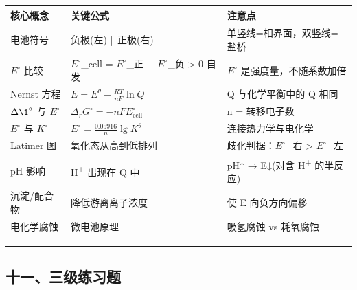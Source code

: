 {\def\LTcaptype{none} %
\begin{longtable}[]{@{}
  >{\raggedright\arraybackslash}p{}
  >{\raggedright\arraybackslash}p{}
  >{\raggedright\arraybackslash}p{}@{}}
\toprule\noalign{}
\begin{minipage}[b]{\linewidth}\raggedright
核心概念
\end{minipage} & \begin{minipage}[b]{\linewidth}\raggedright
关键公式
\end{minipage} & \begin{minipage}[b]{\linewidth}\raggedright
注意点
\end{minipage} \\
\midrule\noalign{}
\endhead
\bottomrule\noalign{}
\endlastfoot
电池符号 & 负极(左) ‖ 正极(右) & 单竖线=相界面，双竖线=盐桥 \\
\(E^{\circ}\) 比较 & \(E^{\circ}\)\_cell = \(E^{\circ}\)\_正 − \(E^{\circ}\)\_负 \textgreater{} 0 自发 & \(E^{\circ}\) 是强度量，不随系数加倍 \\
Nernst 方程 & \(E = E^\theta - \frac{RT}{nF}\ln Q\) & Q 与化学平衡中的 Q 相同 \\
\(\Delta \1^{\circ}\) 与 \(E^{\circ}\) & \(\Delta_rG^\circ = -nFE^\circ_{\text{cell}}\) & n = 转移电子数 \\
\(E^{\circ}\) 与 \(K^{\circ}\) & \(E^\circ = \frac{0.05916}{n}\lg K^\theta\) & 连接热力学与电化学 \\
Latimer 图 & 氧化态从高到低排列 & 歧化判据：\(E^{\circ}\)\_右 \textgreater{} \(E^{\circ}\)\_左 \\
pH 影响 & H\textsuperscript{+} 出现在 Q 中 & pH↑ → E↓(对含 H\textsuperscript{+} 的半反应) \\
沉淀/配合物 & 降低游离离子浓度 & 使 E 向负方向偏移 \\
电化学腐蚀 & 微电池原理 & 吸氢腐蚀 vs 耗氧腐蚀 \\
\end{longtable}
}

\begin{center}\rule{0.5\linewidth}{0.5pt}\end{center}

\subsection{十一、三级练习题}\label{ux5341ux4e00ux4e09ux7ea7ux7ec3ux4e60ux9898}

